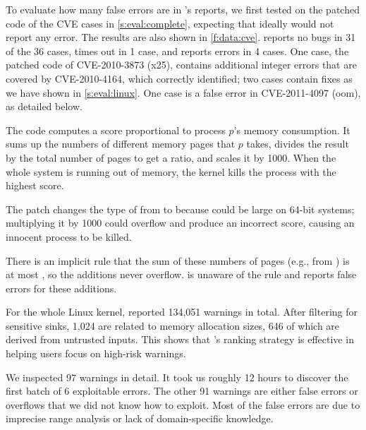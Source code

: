 To evaluate how many false errors are in \sys's reports,
we first tested \sys on the patched code of the CVE cases
in \autoref{s:eval:complete},
expecting that ideally \sys would not report any error.
The results are also shown in \autoref{f:data:cve}.
\sys reports no bugs in 31 of the 36 cases, times out in 1 case, and
reports errors in 4 cases.
%
One case, the patched code of CVE-2010-3873 (x25),
contains additional integer errors that are covered by CVE-2010-4164,
which \sys correctly identified;
two cases contain fixes as we have shown in \autoref{s:eval:linux}.
One case is a false error in CVE-2011-4097 (oom), as detailed below.

The code
computes a score proportional to process $p$'s memory consumption.
It sums up the numbers of different 
memory pages that $p$ takes, divides the result by the total number
of pages to get a ratio, and scales it by 1000.
When the whole system is running out of memory,
the kernel kills the process with the highest score.

The patch changes the type of  from  to  because
 could be large on 64-bit systems; multiplying it by
1000 could overflow and produce an incorrect score,
causing an innocent process to be killed.

There is an implicit rule that the sum of these numbers of pages
(e.g., from ) is at most , so the
additions never overflow.  \sys is unaware of the rule and
reports false errors for these additions.



For the whole Linux kernel, \sys reported 134,051 warnings in total.
After filtering for sensitive sinks, 1,024 are related to memory
allocation sizes, 646 of which are derived from untrusted inputs.
This shows that \sys's ranking strategy is effective in helping users
focus on high-risk warnings.

We inspected 97 warnings in detail.  It took us roughly 12 hours
to discover the first batch of 6 exploitable errors.  The other 91
warnings are either false errors or overflows that we did not know
how to exploit.  Most of the false errors are due to imprecise range
analysis or lack of domain-specific knowledge.


